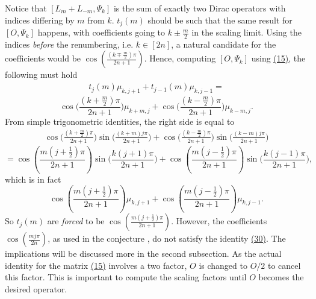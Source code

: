 \documentclass[twoside,11pt,titlepage]{amsart}
\renewcommand{\=}[1]{\stackrel{#1}{=}} %
\theoremstyle{definition}
\theoremstyle{remark}
\begin{document}
Notice that $[L_m+L_{-m},\Psi_k]$ is the sum of exactly two Dirac operators with indices differing by $m$ from $k$. $t_j(m)$ should be such that the same result for $[O,\Psi_k]$ happens, with coefficients going to $k\pm \frac{m}{2}$ in the scaling limit. Using the indices \textit{before} the renumbering, i.e. $k \in [2n]$, a natural candidate for the coefficients would be $\cos(\frac{(k\mp \frac{m}{2})\pi}{2n+1})$. Hence, computing $[O,\Psi_k]$ using \hyperref[eq15]{(15)}, the following must hold
\begin{align}\label{eq30}
t_j(m)\mu_{k,j+1}+t_{j-1}(m)\mu_{k,j-1}=
\end{align}
$$\cos \Big(\frac{(k+\frac{m}{2})\pi}{2n+1}\Big)\mu_{k+m,j}+\cos \Big(\frac{(k-\frac{m}{2})\pi}{2n+1}\Big)\mu_{k-m,j}.$$
From simple trigonometric identities, the right side is equal to
\begin{align}\label{eq31}
\cos \Big(\frac{(k+\frac{m}{2})\pi}{2n+1}\Big)\sin \Big(\frac{(k+m)j\pi}{2n+1} \Big)+\cos \Big(\frac{(k-\frac{m}{2})\pi}{2n+1}\Big)\sin \Big(\frac{(k-m)j\pi}{2n+1} \Big) 
\end{align}
$$=\cos(\frac{m(j+\frac{1}{2})\pi}{2n+1})\sin \Big(\frac{k(j+1)\pi}{2n+1}\Big)+\cos(\frac{m(j-\frac{1}{2})\pi}{2n+1})\sin \Big(\frac{k(j-1)\pi}{2n+1} \Big),$$
which is in fact
$$\cos(\frac{m(j+\frac{1}{2})\pi}{2n+1})\mu_{k,j+1}+\cos(\frac{m(j-\frac{1}{2})\pi}{2n+1})\mu_{k,j-1}.$$
So $t_j(m)$ are \textit{forced} to be $\cos(\frac{m(j+\frac{1}{2})\pi}{2n+1})$. However, the coefficients $\cos(\frac{mj\pi}{2n})$, as used in the conjecture \cite[(7.5)]{koo1994representations}, do not satisfy the identity \hyperref[eq30]{(30)}. The implications will be discussed more in the second subsection. As the actual identity for the matrix \hyperref[eq15]{(15)} involves a two factor, $O$ is changed to $O/2$ to cancel this factor. This is important to compute the scaling factors until $O$ becomes the desired operator.
\end{document}
